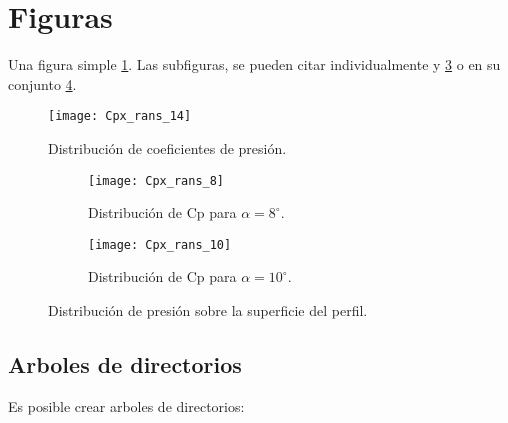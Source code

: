 \section{Figuras}

Una figura simple \ref{fig:Cpx_rans_14}. Las subfiguras, se pueden citar individualmente  y \ref{fig:Cpx_rans_10} o en su conjunto \ref{fig:Cpx_rans_a2}.

\begin{figure}[ht!]
  \centering
    \texttt{[image: Cpx\_rans\_14]}    
    \caption{Distribución de coeficientes de presión.}         
  \label{fig:Cpx_rans_14}                          
\end{figure}


\begin{figure}[ht!]
\centering
\begin{subfigure}{0.5\textwidth}
  \centering
  \texttt{[image: Cpx\_rans\_8]}
  \caption{Distribución de Cp para $\alpha=8^\circ$.}
  \label{fig:Cpx_rans_8}
\end{subfigure}%
\begin{subfigure}{0.5\textwidth}
  \centering
  \texttt{[image: Cpx\_rans\_10]}
  \caption{Distribución de Cp para $\alpha=10^\circ$.}
  \label{fig:Cpx_rans_10}
\end{subfigure}
\caption{Distribución de presión sobre la superficie del perfil.}
\label{fig:Cpx_rans_a2}
\end{figure}    

\subsection{Arboles de directorios}

Es posible crear arboles de directorios:

